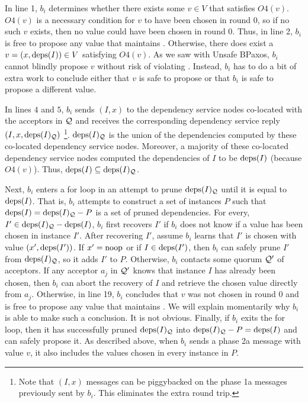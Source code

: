 In line 1, $b_i$ determines whether there exists some $v \in V$ that satisfies
$O4(v)$. $O4(v)$ is a necessary condition for $v$ to have been chosen in round
$0$, so if no such $v$ exists, then no value could have been chosen in round
$0$. Thus, in line 2, $b_i$ is free to propose any value that maintains
.
%
Otherwise, there does exist a $v = (x, \text{deps}(I)) \in V$ satisfying $O4(v)$. As
we saw with Unsafe BPaxos, $b_i$ cannot blindly propose $v$ without risk of
violating . Instead, $b_i$ has to do a bit of extra
work to conclude either that $v$ is safe to propose or that $b_i$ is safe to
propose a different value.

In lines $4$ and $5$, $b_i$ sends $(I, x)$ to the dependency service nodes
co-located with the acceptors in $\mathcal{Q}$ and receives the corresponding
dependency service reply $(I, x, \text{deps}(I)_{\mathcal{Q}})$%
\footnote{%
  Note that $(I, x)$ messages can be piggybacked on the phase 1a messages
  previously sent by $b_i$. This eliminates the extra round trip.
}.
$\text{deps}(I)_{\mathcal{Q}}$ is the union of the dependencies computed by these
co-located dependency service nodes. Moreover, a majority of these co-located
dependency service nodes computed the dependencies of $I$ to be $\text{deps}(I)$
(because $O4(v)$). Thus, $\text{deps}(I) \subseteq \text{deps}(I)_{\mathcal{Q}}$.

Next, $b_i$ enters a for loop in an attempt to prune $\text{deps}(I)_{\mathcal{Q}}$ until
it is equal to $\text{deps}(I)$. That is, $b_i$ attempts to construct a set of
instances $P$ such that $\text{deps}(I) = \text{deps}(I)_{\mathcal{Q}} - P$ is a set of pruned
dependencies. For every, $I' \in \text{deps}(I)_{\mathcal{Q}} - \text{deps}(I)$, $b_i$ first
recovers $I'$ if $b_i$ does not know if a value has been chosen in instance
$I'$. After recovering $I'$, assume $b_i$ learns that $I'$ is chosen with value
$(x', \text{deps}(I'))$. If $x' = \text{noop}$ or if $I \in \text{deps}(I')$, then $b_i$ can
safely prune $I'$ from $\text{deps}(I)_{\mathcal{Q}}$, so it adds $I'$ to $P$.
%
Otherwise, $b_i$ contacts some quorum $\mathcal{Q}'$ of acceptors. If any acceptor
$a_j$ in $\mathcal{Q}'$ knows that instance $I$ has already been chosen, then $b_i$
can abort the recovery of $I$ and retrieve the chosen value directly from
$a_j$. Otherwise, in line 19, $b_i$ concludes that $v$ was not chosen in round
$0$ and is free to propose any value that maintains
. We will explain momentarily why $b_i$ is able to
make such a conclusion. It is not obvious.
%
Finally, if $b_i$ exits the for loop, then it has successfully pruned
$\text{deps}(I)_{\mathcal{Q}}$ into $\text{deps}(I)_{\mathcal{Q}} - P = \text{deps}(I)$ and can safely
propose it. As described above, when $b_i$ sends a phase 2a message with value
$v$, it also includes the values chosen in every instance in $P$.

